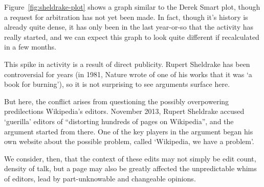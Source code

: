 Figure~\ref{fig:sheldrake-plot} shows a graph similar to the Derek
Smart plot, though a request for arbitration has not yet been made. In
fact, though it's history is already quite dense, it has only been in
the last year-or-so that the activity has really started, and we can
expect this graph to look quite different if recalculated in a few
months.

This spike in activity is a result of direct publicity. Rupert
Sheldrake has been controversial for years (in 1981, Nature wrote of
one of his works that it was `a book for burning'), so it is not
surprising to see arguments surface here. 

But here, the conflict arises from questioning the possibly
overpowering predilections Wikipedia's editors. November 2013, Rupert
Sheldrake accused `guerilla' editors of ``distorting hundreds of pages
on Wikipedia''\cite{sheldrake-bbc-interview}, and the argument started
from there. One of the key players in the argument began his own
website about the possible problem, called `Wikipedia, we have a
problem'.\cite{wiki-problem}

We consider, then, that the context of these edits may not simply be
edit count, density of talk, but a page may also be greatly affected
the unpredictable whims of editors, lead by part-unknowable and
changeable opinions.
